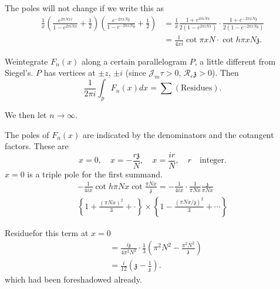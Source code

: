 The poles will not change if we write this as
\begin{align*}
  \frac{1}{x} \left(\frac{e^{2 \pi N x i}}{1- e^{2 \pi i N x}} +
  \frac{1}{2} \right) \left( \frac{e^{- 2 \pi x N \mathfrak{z}}}{1-
    e^{- 2 \pi x N \mathfrak{z}}} + \frac{1}{2}\right) & = \frac{1}{x}
  \frac{1 + e^{2 \pi i N x}}{2 (1- e^{2 \pi i N x})} \cdot \frac{1+
    e^{-2 \pi x N \mathfrak{z}}}{2(1-e^{- 2 \pi x N \mathfrak{z}})}\\
  & = \frac{1}{4 xi} \cot \pi  x N \cdot \cot h \pi x N \mathfrak{z}.
\end{align*}

We\pageoriginale integrate $F_n (x)$ along a certain parallelogram
$P$, a little different from Siegel's. $P$ has vertices at $\pm z$,
$\pm i$ (since $\mathcal{J}_m \tau > 0$, $\mathcal{R}_e \mathfrak{z} >
0$). Then
$$
\frac{1}{2 \pi i} \int_p F_n (x) dx = \sum (\text{Residues}).
$$
\begin{figure}[H]
\end{figure}

We then let $n \to \infty$.

The poles of $F_n (x)$ are indicated by the denominators and the
cotangent factors. These are 
$$
x= 0, \quad x=- \frac{r\mathfrak{z}}{N}, \quad x= \frac{i r}{N}, \quad
r \quad \text{integer}.
$$
$x=0$ is a triple pole for the first summand.
\begin{multline*}
- \frac{1}{4 i x} \cot h \pi N x \cot \frac{\pi N x}{\mathfrak{z}} =
- \frac{1}{4 ix} \cdot \frac{1}{\pi N x} \frac{\mathfrak{z}}{\pi N x}\\
\left\{ 1+ \frac{(\pi N x)^2}{3} + \cdot \right\}\times \left\{ 1-
\frac{(\pi N x/\mathfrak{z})^2}{3}+ \cdots \right\}
\end{multline*}

Residue\pageoriginale for this term at $x=0$
\begin{align*}
  & = \frac{i \mathfrak{z}}{4 \pi^2 N^2} \cdot \frac{1}{3} \left(
  \pi^2 N^2 - \frac{\pi^2 N^2}{\mathfrak{z}} \right)\\
  & = \frac{i}{12} \left( \mathfrak{z} - \frac{1}{\mathfrak{z}}\right).
\end{align*}
which had been foreshadowed already.
